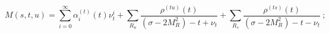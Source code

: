 \begin{equation}
M(s,t,u) =
 \sum\limits_{i=0}^{\infty}{\alpha}^{(t)}_i(t) {\nu}_t^i +
 \sum\limits_{R_u}^{}
      \frac{\rho^{(tu)}(t)}{(\sigma - 2M^2_R)-t+{\nu}_t} +
 \sum\limits_{R_s}^{}
      \frac{\rho^{(ts)}(t)}{(\sigma - 2M^2_R)-t-{\nu}_t}\ ;
\label{1.11}
\end{equation}

